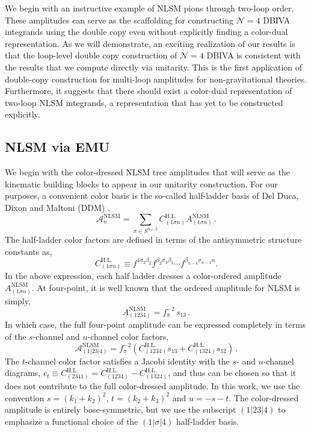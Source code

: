 \documentclass[11pt,letter]{article}
\newcommand{\cHL}[0]{C^{\text{H.L.}}}
\begin{document}
We begin with an instructive example of NLSM pions through two-loop order. These amplitudes can serve as the scaffolding for constructing $\mathcal{N}=4$ DBIVA integrands using the double copy even without explicitly finding a color-dual representation. As we will demonstrate, an exciting realization of our results is that the loop-level double copy construction of $\mathcal{N}=4$ DBIVA is consistent with the results that we compute directly via unitarity. This is the first application of double-copy construction for multi-loop amplitudes for non-gravitational theories. Furthermore, it suggests that there should exist a color-dual representation of two-loop NLSM integrands, a representation that has yet to be constructed explicitly. 

\subsection{NLSM via EMU}\label{sec:NLSMU}

We begin with the color-dressed NLSM tree amplitudes that will serve as the kinematic building blocks to appear in our unitarity construction. For our purposes, a convenient color basis is the so-called half-ladder basis of Del Duca, Dixon and Maltoni (DDM) \cite{DixonMaltoni},
\begin{equation}
\mathcal{A}^{\text{NLSM}}_n = \sum_{\sigma \in S^{n-2}}\cHL_{(1\sigma n)} A^{\text{NLSM}}_{(1\sigma n)}\,.
\end{equation}
The half-ladder color factors are defined in terms of the antisymmetric structure constants as, 
\begin{equation}
\cHL_{(1\sigma n)} \equiv f^{1\sigma_2 \beta_2}f^{\beta_2 \sigma_3 \beta_3} \cdots f^{\beta_{n-1}\sigma_{n-1}n}.
\end{equation} 
In the above expression, each half ladder dresses a color-ordered amplitude $A^{\text{NLSM}}_{(1\sigma n)}$. At four-point, it is well known that the ordered amplitude for NLSM is simply, 
\begin{equation}
A^{\text{NLSM}}_{(1234)} = f_\pi^{-2} \,s_{13}\,.
\end{equation}
In which case, the full four-point amplitude can be expressed completely in terms of the $s$-channel and $u$-channel color factors, 
\begin{equation}\label{eq:NLSMamp} 
\mathcal{A}^{\text{NLSM}}_{(1|23|4)} = f_\pi^{-2}\left(\cHL_{(1234)} s_{13}+\cHL_{(1324)}s_{12}\right)\,.
\end{equation}
The $t$-channel color factor satisfies a Jacobi identity with the $s$- and $u$-channel diagrams, $c_t \equiv\cHL_{(2341)} =\cHL_{(1234)}-\cHL_{(1324)}$, and thus can be chosen so that it does not contribute to the full color-dressed amplitude. In this work, we use the convention $s=(k_1+k_2)^2$, $t=(k_2+k_3)^2$ and $u=-s-t$.  The color-dressed amplitude is entirely bose-symmetric, but we use the subscript $(1|23|4)$ to emphasize a functional choice of the $(1|\sigma|4)$ half-ladder basis.
\end{document}
